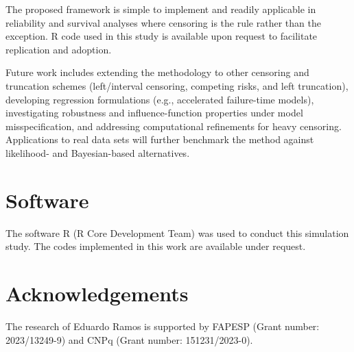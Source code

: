 \documentclass[10pt,a4paper,onecolumn]{article} %
\begin{document}
The proposed framework is simple to implement and readily applicable in reliability and survival analyses where censoring is the rule rather than the exception. \textsf{R} code used in this study is available upon request to facilitate replication and adoption.

Future work includes extending the methodology to other censoring and truncation schemes (left/interval censoring, competing risks, and left truncation), developing regression formulations (e.g., accelerated failure-time models), investigating robustness and influence-function properties under model misspecification, and addressing computational refinements for heavy censoring. Applications to real data sets will further benchmark the method against likelihood- and Bayesian-based alternatives.


\section*{Software}

The software R (R Core Development Team) was used to conduct this simulation study. The codes implemented in this work are available under request.



\section*{Acknowledgements}

The research of 
 Eduardo Ramos is supported by FAPESP
(Grant number: 2023/13249-9) and CNPq (Grant number:  151231/2023-0).



\end{document}
